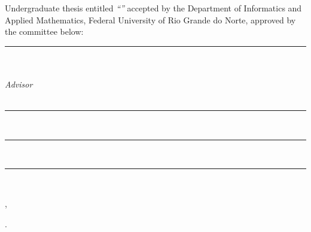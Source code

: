 \clearpage\thispagestyle{empty}
\begin{center}
  Undergraduate thesis entitled \textit{``\thesisTitle''} accepted by the
  Department of Informatics and Applied Mathematics, Federal University of
  Rio Grande do Norte, approved by the committee below:
\end{center}
\vspace{2cm}
\begin{center}
  \rule{10cm}{0.4pt}\\ [0.2cm]
  \thesisAdvisor\\
  \textit{Advisor}\\
  \dimap\\
  \ufrn{}
  \vspace{1.5cm}

  \rule{10cm}{0.4pt}\\[0.2cm]
  \ufrn{}
  \vspace{1.5cm}

  \rule{10cm}{0.4pt}\\[0.2cm]
  \ufrn{}
  \vspace{1.5cm}

  \rule{10cm}{0.4pt}\\[0.2cm]
  \ufrn{}

\end{center}
\vfill
\begin{center}\thesisCity, \thesisMonth{} \thesisYear\end{center}.